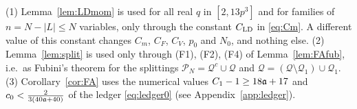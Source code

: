 \begin{remark}\label{rem:FAext}
(1) Lemma~\ref{lem:LDmom} is used for all real $q$ in $[2,13p^3]$ and for families of $n=N-|L|\le N$ variables, only through the constant $C_{\rm LD}$ in \eqref{eq:Cm}. A different value of this constant
changes $C_m$, $C_F$, $C_V$, $p_0$ and $N_0$, and nothing else.
(2) Lemma~\ref{lem:split} is used only through (F1), (F2), (F4) of Lemma~\ref{lem:FAfub}, i.e.\ as Fubini's theorem for the splittings $\mathcal P_N=\mathcal Q^c\cup\mathcal Q$ and $\mathcal Q=(\mathcal Q\setminus\mathcal Q_1)\cup\mathcal Q_1$.
(3) Corollary~\ref{cor:FA} uses the numerical values $C_1-1\ge18\mathfrak{a}+17$ and $c_0<\frac{2}{3(40\mathfrak{a}+40)}$ of the ledger \eqref{eq:ledger0} (see Appendix~\ref{app:ledger}).
\end{remark}
